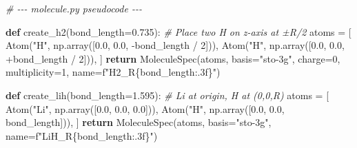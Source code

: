 \documentclass[
  11pt,
]{report}
\newenvironment{Shaded}{}{}
\newcommand{\CommentTok}[1]{\textcolor[rgb]{0.38,0.63,0.69}{\textit{#1}}}
\newcommand{\ControlFlowTok}[1]{\textcolor[rgb]{0.00,0.44,0.13}{\textbf{#1}}}
\newcommand{\DecValTok}[1]{\textcolor[rgb]{0.25,0.63,0.44}{#1}}
\newcommand{\FloatTok}[1]{\textcolor[rgb]{0.25,0.63,0.44}{#1}}
\newcommand{\KeywordTok}[1]{\textcolor[rgb]{0.00,0.44,0.13}{\textbf{#1}}}
\newcommand{\NormalTok}[1]{#1}
\newcommand{\OperatorTok}[1]{\textcolor[rgb]{0.40,0.40,0.40}{#1}}
\newcommand{\SpecialCharTok}[1]{\textcolor[rgb]{0.25,0.44,0.63}{#1}}
\newcommand{\SpecialStringTok}[1]{\textcolor[rgb]{0.73,0.40,0.53}{#1}}
\newcommand{\StringTok}[1]{\textcolor[rgb]{0.25,0.44,0.63}{#1}}
\begin{document}
\begin{Shaded}
\begin{Highlighting}[]
\CommentTok{\# {-}{-}{-} molecule.py pseudocode {-}{-}{-}}

\KeywordTok{def}\NormalTok{ create\_h2(bond\_length}\OperatorTok{=}\FloatTok{0.735}\NormalTok{):}
    \CommentTok{\# Place two H on z{-}axis at ±R/2}
\NormalTok{    atoms }\OperatorTok{=}\NormalTok{ [}
\NormalTok{        Atom(}\StringTok{"H"}\NormalTok{, np.array([}\FloatTok{0.0}\NormalTok{, }\FloatTok{0.0}\NormalTok{, }\OperatorTok{{-}}\NormalTok{bond\_length }\OperatorTok{/} \DecValTok{2}\NormalTok{])),}
\NormalTok{        Atom(}\StringTok{"H"}\NormalTok{, np.array([}\FloatTok{0.0}\NormalTok{, }\FloatTok{0.0}\NormalTok{, }\OperatorTok{+}\NormalTok{bond\_length }\OperatorTok{/} \DecValTok{2}\NormalTok{])),}
\NormalTok{    ]}
    \ControlFlowTok{return}\NormalTok{ MoleculeSpec(atoms, basis}\OperatorTok{=}\StringTok{"sto{-}3g"}\NormalTok{, charge}\OperatorTok{=}\DecValTok{0}\NormalTok{,}
\NormalTok{                        multiplicity}\OperatorTok{=}\DecValTok{1}\NormalTok{, name}\OperatorTok{=}\SpecialStringTok{f"H2\_R}\SpecialCharTok{\{}\NormalTok{bond\_length}\SpecialCharTok{:.3f\}}\SpecialStringTok{"}\NormalTok{)}


\KeywordTok{def}\NormalTok{ create\_lih(bond\_length}\OperatorTok{=}\FloatTok{1.595}\NormalTok{):}
    \CommentTok{\# Li at origin, H at (0,0,R)}
\NormalTok{    atoms }\OperatorTok{=}\NormalTok{ [}
\NormalTok{        Atom(}\StringTok{"Li"}\NormalTok{, np.array([}\FloatTok{0.0}\NormalTok{, }\FloatTok{0.0}\NormalTok{, }\FloatTok{0.0}\NormalTok{])),}
\NormalTok{        Atom(}\StringTok{"H"}\NormalTok{,  np.array([}\FloatTok{0.0}\NormalTok{, }\FloatTok{0.0}\NormalTok{, bond\_length])),}
\NormalTok{    ]}
    \ControlFlowTok{return}\NormalTok{ MoleculeSpec(atoms, basis}\OperatorTok{=}\StringTok{"sto{-}3g"}\NormalTok{, name}\OperatorTok{=}\SpecialStringTok{f"LiH\_R}\SpecialCharTok{\{}\NormalTok{bond\_length}\SpecialCharTok{:.3f\}}\SpecialStringTok{"}\NormalTok{)}



\end{Highlighting}
\end{Shaded}
\end{document}
